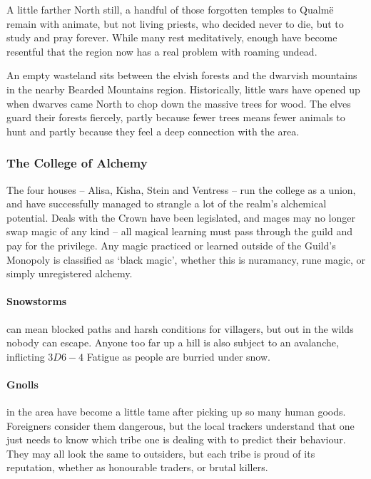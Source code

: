 \begin{multicols}{2}
A little farther North still, a handful of those forgotten temples to Qualm\"{e} remain with animate, but not living priests, who decided never to die, but to study and pray forever.
While many rest meditatively, enough have become resentful that the region now has a real problem with roaming undead.

An empty wasteland sits between the elvish forests and the dwarvish mountains in the nearby Bearded Mountains region.
Historically, little wars have opened up when dwarves came North to chop down the massive trees for wood.
The elves guard their forests fiercely, partly because fewer trees means fewer animals to hunt and partly because they feel a deep connection with the area.

\subsubsection{The College of Alchemy}

The four houses -- Alisa, Kisha, Stein and Ventress -- run the college as a union, and have successfully managed to strangle a lot of the realm's alchemical potential.
Deals with the Crown have been legislated, and mages may no longer swap magic of any kind -- all magical learning must pass through the guild and pay for the privilege.
Any magic practiced or learned outside of the Guild's Monopoly is classified as `black magic', whether this is nuramancy, rune magic, or simply unregistered alchemy.

\paragraph{Snowstorms} can mean blocked paths and harsh conditions for villagers, but out in the wilds nobody can escape.
Anyone too far up a hill is also subject to an avalanche, inflicting $3D6-4$ Fatigue as people are burried under snow.

\paragraph{Gnolls} in the area have become a little tame after picking up so many human goods.
Foreigners consider them dangerous, but the local trackers understand that one just needs to know which tribe one is dealing with to predict their behaviour.
They may all look the same to outsiders, but each tribe is proud of its reputation, whether as honourable traders, or brutal killers.


\end{multicols}
